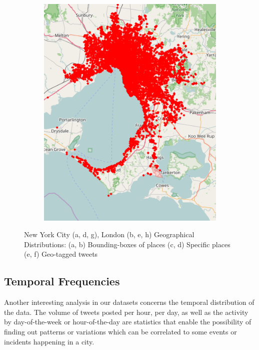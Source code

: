 \begin{figure}[htbp]
	\quad
	\begin{subfigure}[htbp]{0.3\textwidth}
		\centering
		\includegraphics[width=1\linewidth]{figures/melbourne_points.png}
		\caption{}
		\label{subfig:melbourne_points}
	\end{subfigure}
	
	\caption[Three numerical solutions]{New York City (a, d, g), London (b, e, h) Geographical Distributions: (a, b) Bounding-boxes of places (c, d) Specific places (e, f) Geo-tagged tweets}
	\label{fig:nyc_london_melbourne_geographical_distribution}
\end{figure}

\subsection{Temporal Frequencies}

Another interesting analysis in our datasets concerns the temporal distribution of the data. The volume of tweets posted per hour, per day, as well as the activity by day-of-the-week or hour-of-the-day are statistics that enable the possibility of finding out patterns or variations which can be correlated to some events or incidents happening in a city.

